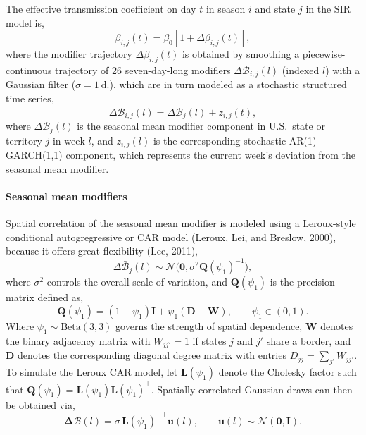 \documentclass[11pt]{article}
\newcommand{\Normal}{\mathcal{N}}
\begin{document}
The effective transmission coefficient on day $t$ in season $i$ and state $j$ in the SIR model is,
\begin{equation}
\beta_{i,j}(t) = \beta_0 \left[ 1 + \Delta \beta_{i,j}(t) \right],
\end{equation}
where the modifier trajectory $\Delta \beta_{i,j}(t)$ is obtained by smoothing a piecewise-continuous trajectory of 26 seven-day-long modifiers $\Delta \mathcal{B}_{i,j}(l)$ (indexed $l$) with a Gaussian filter ($\sigma = 1~\text{d.}$), which are in turn modeled as a stochastic structured time series,
\begin{equation}
    \Delta \mathcal{B}_{i,j} (l) = \Delta\bar{\mathcal{B}_{j}}(l) + z_{i,j}(t),
\end{equation}
where $\Delta\bar{\mathcal{B}_{j}}(l)$ is the seasonal mean modifier component in U.S.\ state or territory $j$ in week $l$, and $z_{i,j}(l)$ is the corresponding stochastic AR(1)--GARCH(1,1) component, which represents the current week's deviation from the seasonal mean modifier.

\paragraph{Seasonal mean modifiers}
Spatial correlation of the seasonal mean modifier is modeled using a Leroux-style conditional autogregressive or CAR model (Leroux, Lei, and Breslow, 2000), because it offers great flexibility (Lee, 2011),
\begin{equation}
    \Delta \bar{\mathcal{B}}_j(l) \sim \Normal\big(\bm{0}, \sigma^2 \bm{Q}(\psi_1)^{-1}\big),
\end{equation}
where $\sigma^2$ controls the overall scale of variation, and $\bm{Q}(\psi_1)$ is the precision matrix defined as,
\begin{equation}
    \bm{Q}(\psi_1) = (1 - \psi_1)\bm{I} + \psi_1 (\bm{D} - \bm{W}), 
    \qquad \psi_1 \in (0,1).
\end{equation}
Where $\psi_1 \sim \text{Beta}(3,3)$ governs the strength of spatial dependence, $\bm{W}$ denotes the binary adjacency matrix with $W_{jj'} = 1$ if states $j$ and $j'$ share a border, and $\bm{D}$ denotes the corresponding diagonal degree matrix with entries $D_{jj} = \sum_{j'} W_{jj'}$. To simulate the Leroux CAR model, let $\bm{L}(\psi_1)$ denote the Cholesky factor such that $\bm{Q}(\psi_1) = \bm{L}(\psi_1)\bm{L}(\psi_1)^\top$. Spatially correlated Gaussian draws can then be obtained via,
\begin{equation}
    \bm{\Delta \bar{\mathcal{B}}}(l) = \sigma \, \bm{L}(\psi_1)^{-\top} \bm{u}(l), 
    \qquad \bm{u}(l) \sim \Normal(\bm{0}, \bm{I}).
\end{equation}
\end{document}
